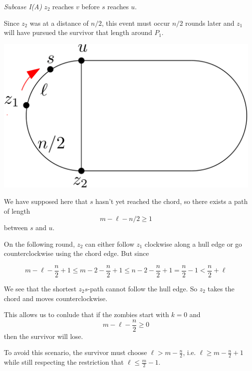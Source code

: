 \documentclass[letterpaper, 10pt]{article}
\begin{document}
\begin{enumerate}
       \emph{Subcase I(A)} $z_2$ reaches $v$ before $s$ reaches $u$.

       Since $z_2$ was at a distance of $n/2$, this event must occur $n/2$ rounds later and $z_1$ will
       have pursued the survivor that length around $P_1$.

       \begin{center}
        \includegraphics[scale=0.15]{diagramCaseIA_1}
       \end{center}

       We have supposed here that $s$ hasn't yet reached the chord, so there exists a path of length
       \[m - \ell -n/2 \geq 1 \]
       between $s$ and $u$.

       On the following round, $z_2$ can either follow $z_1$ clockwise along a hull edge or go
       counterclockwise using the chord edge. But since

       \[ m - \ell - \frac{n}{2} +1 \leq m - 2 -\frac{n}{2}  +1 \leq n - 2 - \frac{n}{2} +1 = \frac{n}{2} -1 < \frac{n}{2} + \ell\]

       We see that the shortest $z_2s$-path cannot follow the hull edge.
       So $z_2$ takes the chord and moves counterclockwise.


       This allows us to conlude that if the zombies start with $k=0$ and
       \[ m - \ell -\frac{n}{2}  \geq 0 \]
       then the survivor will lose.

       To avoid this scenario, the survivor must choose $\ell > m - \frac{n}{2}$,
       i.e. $\ell \geq m - \frac{n}{2} +1$
       while still respecting the restriction that $\ell \leq \frac{m}{2}-1$.


\end{enumerate}
\end{document}

